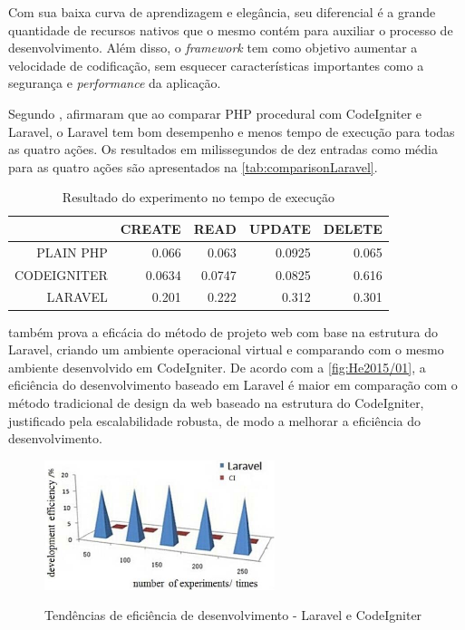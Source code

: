 Com sua baixa curva de aprendizagem e elegância, seu diferencial é a grande quantidade de recursos nativos que o mesmo contém para auxiliar o processo de desenvolvimento. Além disso, o \textit{framework} tem como objetivo aumentar a velocidade de codificação, sem esquecer características importantes como a segurança e \textit{performance} da aplicação.

Segundo , afirmaram que ao comparar PHP procedural com CodeIgniter e Laravel, o Laravel tem bom desempenho e menos tempo de execução para todas as quatro ações. Os resultados em milissegundos de dez entradas como média para as quatro ações são apresentados na \autoref{tab:comparisonLaravel}.

\begin{table}[H]
    \centering
    \caption{Resultado do experimento no tempo de execução
    \label{tab:comparisonLaravel}}
    \begin{tabular}{rrrrr}
            \toprule
            & CREATE    & READ      & UPDATE    & DELETE \\
            \midrule
            PLAIN PHP   & 0.066     & 0.063    & 0.0925   & 0.065 \\
            CODEIGNITER & 0.0634    & 0.0747   & 0.0825   & 0.616 \\
            LARAVEL     & 0.201     & 0.222    & 0.312    & 0.301 \\
            \bottomrule
    \end{tabular}
\end{table}

 também prova a eficácia do método de projeto web com base na estrutura do Laravel, criando um ambiente operacional virtual e comparando com o mesmo ambiente desenvolvido em CodeIgniter. De acordo com a \autoref{fig:He2015/01}, a eficiência do desenvolvimento baseado em Laravel é maior em comparação com o método tradicional de design da web baseado na estrutura do CodeIgniter, justificado pela escalabilidade robusta, de modo a melhorar a eficiência do desenvolvimento.

\begin{figure}[H]
    \centering
    \caption{Tendências de eficiência de desenvolvimento - Laravel e CodeIgniter}
    \includegraphics[width=0.6\textwidth]{./dados/figuras/fig9}
    \label{fig:He2015/01}
\end{figure}


